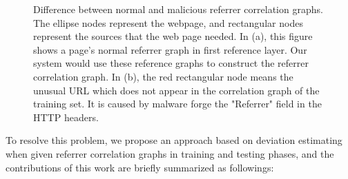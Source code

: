 \begin{figure}[!tbp]
  \centering
  \hfill
  \caption{Difference between normal and malicious referrer correlation graphs. The ellipse nodes represent the webpage, and rectangular nodes represent the sources that the web page needed.
In (a), this figure shows a page's normal referrer graph in first reference layer. Our system would use these reference graphs to construct the referrer correlation graph.
In (b), the red rectangular node means the unusual URL which does not appear in the correlation graph of the training set.  It is caused by malware forge the "Referrer" field in the HTTP headers.}
\label{fig:length_count}
\end{figure}

To resolve this problem, we propose an approach based on deviation estimating when given referrer correlation graphs in training and testing phases, and the contributions of this work are briefly summarized as followings:

